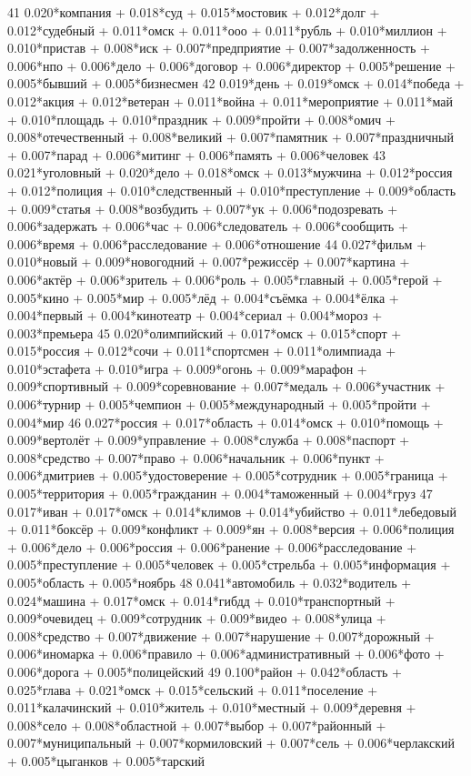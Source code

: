 41 0.020*компания + 0.018*суд + 0.015*мостовик + 0.012*долг + 0.012*судебный + 0.011*омск + 0.011*ооо + 0.011*рубль + 0.010*миллион + 0.010*пристав + 0.008*иск + 0.007*предприятие + 0.007*задолженность + 0.006*нпо + 0.006*дело + 0.006*договор + 0.006*директор + 0.005*решение + 0.005*бывший + 0.005*бизнесмен
42 0.019*день + 0.019*омск + 0.014*победа + 0.012*акция + 0.012*ветеран + 0.011*война + 0.011*мероприятие + 0.011*май + 0.010*площадь + 0.010*праздник + 0.009*пройти + 0.008*омич + 0.008*отечественный + 0.008*великий + 0.007*памятник + 0.007*праздничный + 0.007*парад + 0.006*митинг + 0.006*память + 0.006*человек
43 0.021*уголовный + 0.020*дело + 0.018*омск + 0.013*мужчина + 0.012*россия + 0.012*полиция + 0.010*следственный + 0.010*преступление + 0.009*область + 0.009*статья + 0.008*возбудить + 0.007*ук + 0.006*подозревать + 0.006*задержать + 0.006*час + 0.006*следователь + 0.006*сообщить + 0.006*время + 0.006*расследование + 0.006*отношение
44 0.027*фильм + 0.010*новый + 0.009*новогодний + 0.007*режиссёр + 0.007*картина + 0.006*актёр + 0.006*зритель + 0.006*роль + 0.005*главный + 0.005*герой + 0.005*кино + 0.005*мир + 0.005*лёд + 0.004*съёмка + 0.004*ёлка + 0.004*первый + 0.004*кинотеатр + 0.004*сериал + 0.004*мороз + 0.003*премьера
45 0.020*олимпийский + 0.017*омск + 0.015*спорт + 0.015*россия + 0.012*сочи + 0.011*спортсмен + 0.011*олимпиада + 0.010*эстафета + 0.010*игра + 0.009*огонь + 0.009*марафон + 0.009*спортивный + 0.009*соревнование + 0.007*медаль + 0.006*участник + 0.006*турнир + 0.005*чемпион + 0.005*международный + 0.005*пройти + 0.004*мир
46 0.027*россия + 0.017*область + 0.014*омск + 0.010*помощь + 0.009*вертолёт + 0.009*управление + 0.008*служба + 0.008*паспорт + 0.008*средство + 0.007*право + 0.006*начальник + 0.006*пункт + 0.006*дмитриев + 0.005*удостоверение + 0.005*сотрудник + 0.005*граница + 0.005*территория + 0.005*гражданин + 0.004*таможенный + 0.004*груз
47 0.017*иван + 0.017*омск + 0.014*климов + 0.014*убийство + 0.011*лебедовый + 0.011*боксёр + 0.009*конфликт + 0.009*ян + 0.008*версия + 0.006*полиция + 0.006*дело + 0.006*россия + 0.006*ранение + 0.006*расследование + 0.005*преступление + 0.005*человек + 0.005*стрельба + 0.005*информация + 0.005*область + 0.005*ноябрь
48 0.041*автомобиль + 0.032*водитель + 0.024*машина + 0.017*омск + 0.014*гибдд + 0.010*транспортный + 0.009*очевидец + 0.009*сотрудник + 0.009*видео + 0.008*улица + 0.008*средство + 0.007*движение + 0.007*нарушение + 0.007*дорожный + 0.006*иномарка + 0.006*правило + 0.006*административный + 0.006*фото + 0.006*дорога + 0.005*полицейский
49 0.100*район + 0.042*область + 0.025*глава + 0.021*омск + 0.015*сельский + 0.011*поселение + 0.011*калачинский + 0.010*житель + 0.010*местный + 0.009*деревня + 0.008*село + 0.008*областной + 0.007*выбор + 0.007*районный + 0.007*муниципальный + 0.007*кормиловский + 0.007*сель + 0.006*черлакский + 0.005*цыганков + 0.005*тарский

